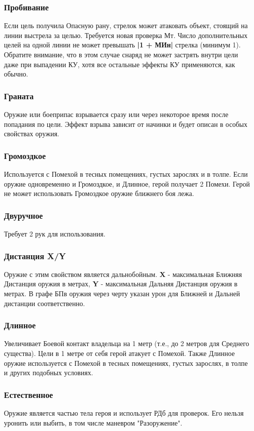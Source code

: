 \subsubsection{Пробивание} Если цель получила Опасную рану, стрелок может атаковать объект, стоящий на линии выстрела за целью. Требуется новая проверка Мт. Число дополнительных целей на одной линии не может превышать \textbf{|1 + МИн|} стрелка (минимум 1). Обратите внимание, что в этом случае снаряд не может застрять внутри цели даже при выпадении КУ, хотя все остальные эффекты КУ применяются, как обычно.
\subsubsection{Граната} Оружие или боеприпас взрывается сразу или через некоторое время после попадания по цели. Эффект взрыва зависит от начинки и будет описан в особых свойствах оружия.
\subsubsection{Громоздкое} Используется с Помехой в тесных помещениях, густых зарослях и в толпе. Если оружие одновременно и Громоздкое, и Длинное, герой получает 2 Помехи. Герой не может использовать Громоздкое оружие ближнего боя лежа.
\subsubsection{Двуручное} Требует 2 рук для использования.
\subsubsection{Дистанция X/Y} Оружие с этим свойством является дальнобойным. \textbf{X} - максимальная Ближняя Дистанция оружия в метрах, \textbf{Y} - максимальная Дальняя Дистанция оружия в метрах. В графе БПв оружия через черту указан урон для Ближней и Дальней дистанции соответственно.
\subsubsection{Длинное} Увеличивает Боевой контакт владельца на 1 метр (т.е., до 2 метров для Среднего существа). Цели в 1 метре от себя герой атакует с Помехой. Также Длинное оружие используется с Помехой в тесных помещениях, густых зарослях, в толпе и других подобных условиях.
\subsubsection{Естественное} Оружие является частью тела героя и использует РДб для проверок. Его нельзя уронить или выбить, в том числе маневром "Разоружение".
